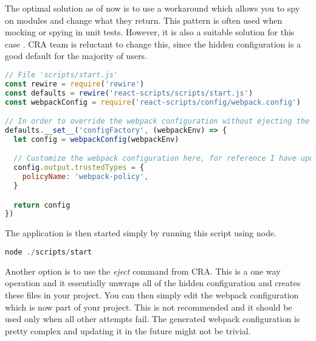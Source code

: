The optimal solution as of now is to use a workaround which allows you to spy on modules and change
what they return. This pattern is often used when mocking or spying in unit tests. However, it is
also a suitable solution for this case \cite{cra_modify_webpack_config}. CRA team is reluctant to
change this, since the hidden configuration is a good default for the majority of users.

\bigskip
\begin{lstlisting}[language=JavaScript, caption=Script to start React application with Trusted Types enabled in webpack]
// File 'scripts/start.js'
const rewire = require('rewire')
const defaults = rewire('react-scripts/scripts/start.js')
const webpackConfig = require('react-scripts/config/webpack.config')

// In order to override the webpack configuration without ejecting the create-react-app
defaults.__set__('configFactory', (webpackEnv) => {
  let config = webpackConfig(webpackEnv)

  // Customize the webpack configuration here, for reference I have updated webpack externals field
  config.output.trustedTypes = {
    policyName: 'webpack-policy',
  }

  return config
})
\end{lstlisting}

The application is then started simply by running this script using node.

\bigskip
\begin{lstlisting}[language=JavaScript, caption=Running the application]
node ./scripts/start
\end{lstlisting}

Another option is to use the \textit{eject} command from CRA. This is a one way operation and it
essentially unwraps all of the hidden configuration and creates these files in your project. You can
then simply edit the webpack configuration which is now part of your project. This is not
recommended and it should be used only when all other attempts fail. The generated webpack
configuration is pretty complex and updating it in the future might not be trivial.
